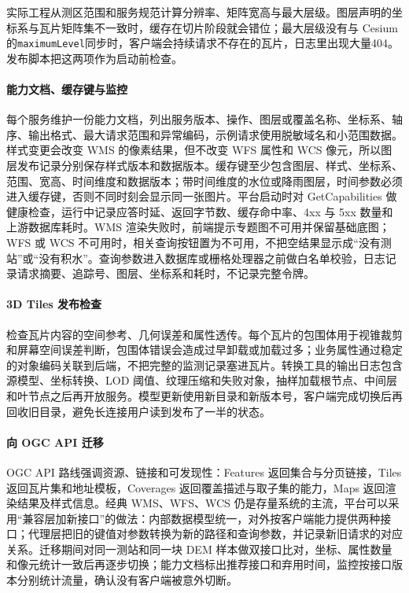 实际工程从测区范围和服务规范计算分辨率、矩阵宽高与最大层级。图层声明的坐标系与瓦片矩阵集不一致时，缓存在切片阶段就会错位；最大层级没有与 Cesium 的\texttt{maximumLevel}同步时，客户端会持续请求不存在的瓦片，日志里出现大量404。发布脚本把这两项作为启动前检查。

\paragraph{能力文档、缓存键与监控}每个服务维护一份能力文档，列出服务版本、操作、图层或覆盖名称、坐标系、轴序、输出格式、最大请求范围和异常编码，示例请求使用脱敏域名和小范围数据。样式变更会改变 WMS 的像素结果，但不改变 WFS 属性和 WCS 像元，所以图层发布记录分别保存样式版本和数据版本。缓存键至少包含图层、样式、坐标系、范围、宽高、时间维度和数据版本；带时间维度的水位或降雨图层，时间参数必须进入缓存键，否则不同时刻会显示同一张图片。平台启动时对 GetCapabilities 做健康检查，运行中记录应答时延、返回字节数、缓存命中率、4xx 与 5xx 数量和上游数据库耗时。WMS 渲染失败时，前端提示专题图不可用并保留基础底图；WFS 或 WCS 不可用时，相关查询按钮置为不可用，不把空结果显示成“没有测站”或“没有积水”。查询参数进入数据库或栅格处理器之前做白名单校验，日志记录请求摘要、追踪号、图层、坐标系和耗时，不记录完整令牌。

\paragraph{3D Tiles 发布检查}检查瓦片内容的空间参考、几何误差和属性透传。每个瓦片的包围体用于视锥裁剪和屏幕空间误差判断，包围体错误会造成过早卸载或加载过多；业务属性通过稳定的对象编码关联到后端，不把完整的监测记录塞进瓦片。转换工具的输出日志包含源模型、坐标转换、LOD 阈值、纹理压缩和失败对象，抽样加载根节点、中间层和叶节点之后再开放服务。模型更新使用新目录和新版本号，客户端完成切换后再回收旧目录，避免长连接用户读到发布了一半的状态。

\paragraph{向 OGC API 迁移}OGC API 路线强调资源、链接和可发现性：Features 返回集合与分页链接，Tiles 返回瓦片集和地址模板，Coverages 返回覆盖描述与取子集的能力，Maps 返回渲染结果及样式信息。经典 WMS、WFS、WCS 仍是存量系统的主流，平台可以采用“兼容层加新接口”的做法：内部数据模型统一，对外按客户端能力提供两种接口；代理层把旧的键值对参数转换为新的路径和查询参数，并记录新旧请求的对应关系。迁移期间对同一测站和同一块 DEM 样本做双接口比对，坐标、属性数量和像元统计一致后再逐步切换；能力文档标出推荐接口和弃用时间，监控按接口版本分别统计流量，确认没有客户端被意外切断。

